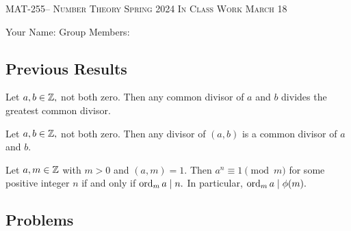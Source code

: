 \documentclass[handout]{ximera}
\date{March 18, 2024}
\begin{document}
\handoutAbstract
\maketitle
 	\begin{center}%
    		{\large \scshape MAT-255-- Number Theory 
			\hfill Spring 2024 
			\hfill In Class Work March 18}%
    
		{\large Your Name: \hrulefill \quad 
			Group Members:\hrulefill \quad 
			\hrulefill
			\par}%
 	\end{center}%
	
 \subsection*{Previous Results}
 \begin{lemma}\label{lem:gcd_mult}
	Let $a,b\in\mathbb Z,$ not both zero. Then any  common divisor of $a$ and $b$ divides the greatest common divisor.
\end{lemma}


\begin{lemma}\label{lem:gcd_trans}
 	Let $a,b\in\mathbb Z,$ not both zero. Then any divisor of $(a,b)$ is a common divisor of $a$ and $b$.
\end{lemma}
 
 \begin{proposition}[Proposition 5.1]\label{prop:order_divides_phi}
    Let $a,m\in\mathbb Z$ with $m>0$ and $(a,m)=1.$ Then $a^n\equiv 1\pmod{m}$ for some positive integer $n$ if and only if $\operatorname{ord}_m a\mid n.$ In particular, $\operatorname{ord}_m a\mid \phi(m).$
\end{proposition}

\subsection*{Problems}
\end{document}
